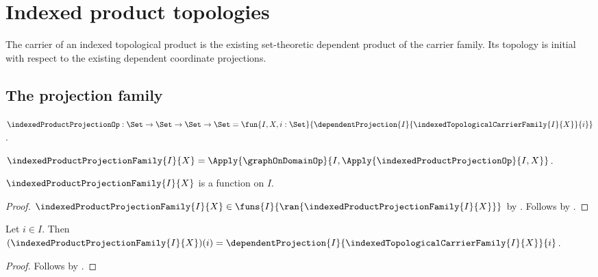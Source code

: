 \section{Indexed product topologies}




The carrier of an indexed topological product is the existing set-theoretic
dependent product of the carrier family.  Its topology is initial with
respect to the existing dependent coordinate projections.

\subsection{The projection family}

\begin{definition}\label{indexed_product_projection_op}
    $\indexedProductProjectionOp:\Set\to\Set\to\Set\to\Set
        =\fun{I,X,i:\Set}{
            \dependentProjection{I}{
                \indexedTopologicalCarrierFamily{I}{X}}{i}}$.
\end{definition}

\begin{definition}\label{indexed_product_projection_family}
    $\indexedProductProjectionFamily{I}{X}
        =\Apply{\graphOnDomainOp}{
            I,\Apply{\indexedProductProjectionOp}{I,X}}$.
\end{definition}

\begin{proposition}\label{indexed_product_projection_family_type}
    $\indexedProductProjectionFamily{I}{X}$ is a function on $I$.
\end{proposition}
\begin{proof}
    $\indexedProductProjectionFamily{I}{X}\in
        \funs{I}{\ran{\indexedProductProjectionFamily{I}{X}}}$ by
        .
    Follows by .
\end{proof}

\begin{proposition}\label{indexed_product_projection_family_apply}
    Let $i\in I$.
    Then $(\indexedProductProjectionFamily{I}{X})(i)
        =\dependentProjection{I}{
            \indexedTopologicalCarrierFamily{I}{X}}{i}$.
\end{proposition}
\begin{proof}
    Follows by
        .
\end{proof}

